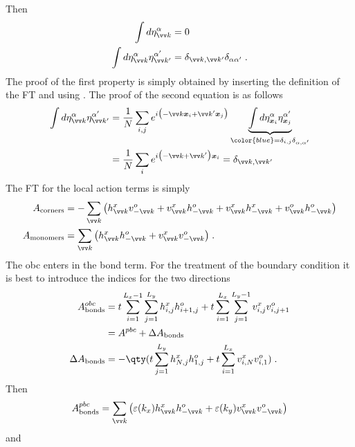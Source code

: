 %
Then
%
\begin{align*}
\int d  \eta^{\alpha}_{\vv k} &= 0\\
\int d  \eta^{\alpha}_{\vv k} \eta^{\alpha'}_{\vv k'}&= \delta_{\vv k,\vv k'}\delta_{\alpha\alpha'} \;.
\end{align*}
%
The proof of the first property is simply obtained by inserting the definition of the 
FT and using . The proof of the second equation is as follows
%
\begin{align*}
\int d  \eta^{\alpha}_{\vv k} \eta^{\alpha'}_{\vv k'}
&=\frac{1}{N}\sum_{i,j} e^{i\big(-\vv k\xx{i} +\vv k'\xx{j}\big)} 
\underbrace{
\int d\eta^{\alpha}_{\xx{i}} \eta^{\alpha'}_{\xx{j}}
}_{\color{blue} = \delta_{i,j}\delta_{\alpha,\alpha'}}\\
&=\frac{1}{N}\sum_{i} e^{i\big(-\vv k +\vv k'\big)\xx{i}}   = \delta_{\vv k,\vv k'}
\end{align*}
%
The FT for the local action terms is simply 
\begin{subequations}\label{eq:}
\begin{align}
A_\text{corners} &=  -\sum_{\vv k} \big(\hdag{\vv k} \vnag{-\vv k}+\vdag{\vv k} \hnag{-\vv k}
+\vdag{\vv k} \hdag{-\vv k} +\vnag{\vv k} \hnag{-\vv k} \big)\\
A_\text{monomers} &=  \sum_{\vv k} \big(\hdag{\vv k} \hnag{-\vv k}
+\vdag{\vv k}\vnag{-\vv k} \big) \;.
\end{align}
\end{subequations}
%
The obc enters in the bond term.
For the treatment of the boundary condition it is best to introduce the  indices for the two directions
%
\begin{align*}
 A^{obc}_\text{bonds}  &= t \sum_{i=1}^{L_{x}-1} \sum_{j=1}^{L_{y}}
 \hdag{i,j} \hnag{i+1,j}
+ t \sum_{i=1}^{L_{x}} \sum_{j=1}^{L_{y}-1} \vdag{i,j} \vnag{i,j+1}\\
&= A^{pbc}  + \Delta A_\text{bonds}\\
\Delta A_\text{bonds} &=- \qty(t  \sum_{j=1}^{L_{y}}
 \hdag{N,j} \hnag{1,j}
+ t \sum_{i=1}^{L_{x}}\vdag{i,N} \vnag{i,1})\;.
\end{align*}
%
Then 
%
\begin{align*}
A^{pbc}_\text{bonds} &= \sum_{\vv k} \big(\varepsilon(k_{x}) \hdag{\vv k} \hnag{-\vv k}
+ \varepsilon(k_{y}) \vdag{\vv k} \vnag{-\vv k}\big)\\
\end{align*}
%
and
%
